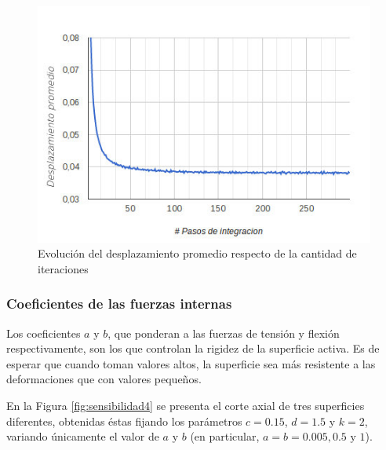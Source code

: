 \begin{figure}[H]
	\centering
	\includegraphics[scale=0.8]{images/convergencia_snakes.jpg}
	\caption{Evolución del desplazamiento promedio respecto de la cantidad de iteraciones}
	\label{fig:convergencia_snakes}
\end{figure}

\subsubsection{Coeficientes de las fuerzas internas}
Los coeficientes $a$ y $b$, que ponderan a las fuerzas de tensión y flexión respectivamente, son
los que controlan la rigidez de la superficie activa. Es de esperar que cuando toman valores altos, la superficie sea más resistente a las deformaciones que con valores pequeños. 

En la Figura \ref{fig:sensibilidad4} se presenta el corte axial de tres superficies diferentes, obtenidas éstas fijando los parámetros $c=0.15$, $d=1.5$ y $k=2$, variando únicamente el valor de $a$ y $b$ (en particular, $a=b=0.005, 0.5 \text{ y } 1$).

